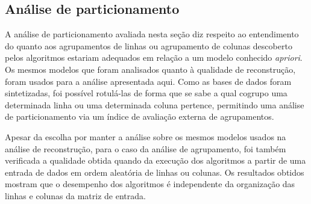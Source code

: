 \documentclass[
    12pt,                %
    oneside,            %
    a4paper,            %
    english,            %
    brazil                %
    ]{abntex2ppgsi}
\begin{document}

\subsection{Análise de particionamento}

A análise de particionamento avaliada nesta seção diz respeito ao entendimento do quanto aos agrupamentos de linhas ou agrupamento de colunas descoberto pelos algoritmos estariam adequados em relação a um modelo conhecido \textit{apriori}. Os mesmos modelos que foram analisados quanto à qualidade de reconstrução, foram usados para a análise apresentada aqui. Como as bases de dados foram sintetizadas, foi possível rotulá-las de forma que se sabe a qual cogrupo uma determinada linha ou uma determinada coluna pertence, permitindo uma análise de particionamento via um índice de avaliação externa de agrupamentos.

Apesar da escolha por manter a análise sobre os mesmos modelos usados na análise de reconstrução, para o caso da análise de agrupamento, foi também verificada a qualidade obtida quando da execução dos algoritmos a partir de uma entrada de dados em ordem aleatória de linhas ou colunas. Os resultados obtidos mostram que o desempenho dos algoritmos é independente da organização das linhas e colunas da matriz de entrada.
\end{document}
